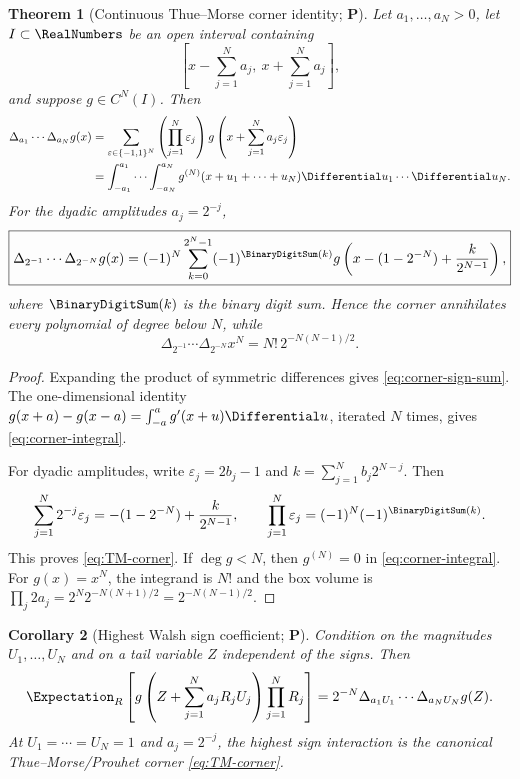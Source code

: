 \documentclass[11pt,oneside]{article}
\newtheorem{theorem}{Theorem}[section]
\newtheorem{corollary}[theorem]{Corollary}
\theoremstyle{definition}
\theoremstyle{remark}
\newcommand{\statusP}{\textcolor{deepgreen}{\textbf{P}}}
\begin{document}
\begin{theorem}[Continuous Thue--Morse corner identity; \statusP]
\label{thm:TM-corner}
Let $a_1,\ldots,a_N>0$, let $I\subset\RealNumbers$ be an open interval containing
\[
 \left[x-\sum_{j=1}^Na_j,\ x+\sum_{j=1}^Na_j\right],
\]
and suppose $g\in C^N(I)$.  Then
\begin{align}
 \Delta_{a_1}\cdots\Delta_{a_N}g(x)
 &=\sum_{\varepsilon\in\{-1,1\}^N}
   \left(\prod_{j=1}^N\varepsilon_j\right)
   g\left(x+\sum_{j=1}^Na_j\varepsilon_j\right)
 \label{eq:corner-sign-sum}\\
 &=\int_{-a_1}^{a_1}\cdots\int_{-a_N}^{a_N}
   g^{(N)}(x+u_1+\cdots+u_N)\Differential u_1\cdots\Differential u_N.
 \label{eq:corner-integral}
\end{align}
For the dyadic amplitudes $a_j=2^{-j}$,
\begin{equation}
 \boxed{
 \Delta_{2^{-1}}\cdots\Delta_{2^{-N}}g(x)
 =(-1)^N\sum_{k=0}^{2^N-1}(-1)^{\BinaryDigitSum(k)}
 g\left(x-(1-2^{-N})+\frac{k}{2^{N-1}}\right),}
 \label{eq:TM-corner}
\end{equation}
where $\BinaryDigitSum(k)$ is the binary digit sum.  Hence the corner annihilates every
polynomial of degree below $N$, while
\begin{equation}
 \Delta_{2^{-1}}\cdots\Delta_{2^{-N}}x^N
 =N!\,2^{-N(N-1)/2}.
 \label{eq:TM-top}
\end{equation}
\end{theorem}

\begin{proof}
Expanding the product of symmetric differences gives
\eqref{eq:corner-sign-sum}.  The one-dimensional identity
$g(x+a)-g(x-a)=\int_{-a}^ag'(x+u)\Differential u$, iterated $N$ times, gives
\eqref{eq:corner-integral}.

For dyadic amplitudes, write
$\varepsilon_j=2b_j-1$ and
$k=\sum_{j=1}^Nb_j2^{N-j}$.  Then
\[
 \sum_{j=1}^N2^{-j}\varepsilon_j
 =-(1-2^{-N})+\frac{k}{2^{N-1}},
 \qquad
 \prod_{j=1}^N\varepsilon_j=(-1)^N(-1)^{\BinaryDigitSum(k)}.
\]
This proves \eqref{eq:TM-corner}.  If $\deg g<N$, then $g^{(N)}=0$ in
\eqref{eq:corner-integral}.  For $g(x)=x^N$, the integrand is $N!$ and the
box volume is
$\prod_j2a_j=2^N2^{-N(N+1)/2}=2^{-N(N-1)/2}$.
\end{proof}

\begin{corollary}[Highest Walsh sign coefficient; \statusP]
\label{cor:Walsh-corner}
Condition on the magnitudes $U_1,\ldots,U_N$ and on a tail variable $Z$
independent of the signs.  Then
\begin{equation}
 \Expectation_R\left[
 g\left(Z+\sum_{j=1}^Na_jR_jU_j\right)
 \prod_{j=1}^NR_j\right]
 =2^{-N}\Delta_{a_1U_1}\cdots\Delta_{a_NU_N}g(Z).
 \label{eq:Walsh-corner}
\end{equation}
At $U_1=\cdots=U_N=1$ and $a_j=2^{-j}$, the highest sign interaction is the
canonical Thue--Morse/Prouhet corner \eqref{eq:TM-corner}.
\end{corollary}
\end{document}
